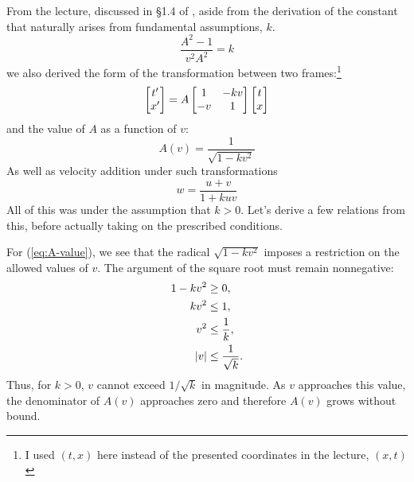 	\begin{solution_pset}
		\nocite{juan2026}

		From the lecture, discussed in \S 1.4 of \cite{juan2026}, aside from the
		derivation of the constant that naturally arises 
		from fundamental assumptions, $k$.
		\begin{equation}
			\label{eq:k-constant}
		    \frac{A^2 - 1}{v^2 A^2} = k 
		\end{equation}
		we also derived the form of the transformation
		between two frames:\footnote{I used $(t,x)$ here
		instead of the presented coordinates in the lecture, 
		$(x,t)$}
		\begin{equation}
			\label{eq:transform}
		    \bmqty{
		    	t'\\x'
		    } 
			=
			A
			\bmqty{
				1  & -kv \\
				-v & 1
			} 
			\bmqty{
				t\\x
			} 
		\end{equation}
		and the value of $A$ as a function of $v$:
		\begin{equation}
			\label{eq:A-value}
			A(v) =
			\frac{1}{\sqrt{1-kv^2}} 
		\end{equation}
		As well as velocity addition under such transformations
		\begin{equation}
			\label{eq:velocity-addition}
		    w
			=
			\frac{u+v}{1+kuv} 
		\end{equation}
		All of this was under the assumption that $k>0$.
		Let's derive a few relations from this, before actually
		taking on the prescribed conditions.

		For (\ref{eq:A-value}), we see that the radical
		$\sqrt{1-kv^2}$ imposes a restriction on the allowed values
		of $v$. The argument of the square root must remain
		nonnegative:
		\begin{align*}
			1-kv^2 &\geq 0,\\
			kv^2 &\leq 1,\\
			v^2 &\leq \frac{1}{k},\\
			\abs{v} &\leq \frac{1}{\sqrt{k}}.
		\end{align*}
		Thus, for $k>0$, $v$ cannot exceed $1/\sqrt{k}$ in magnitude.
		As $v$ approaches this value, the denominator of $A(v)$
		approaches zero and therefore $A(v)$ grows without bound.
		

\end{solution_pset}
